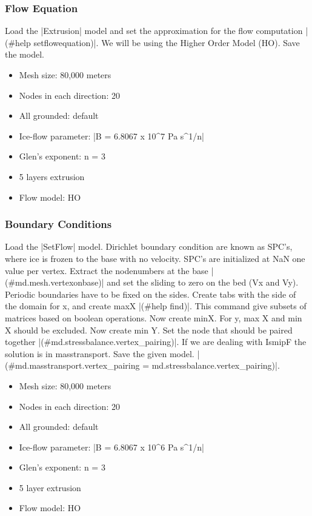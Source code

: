\subsubsection{Flow Equation} %
Load the \lstinlinebg|Extrusion| model and set the approximation for the flow computation \lstinlinebg|(#help setflowequation)|. We will be using the Higher Order Model (HO). Save the model.
\begin{itemize}
	\item Mesh size: 80,000 meters
	\item Nodes in each direction: 20
	\item All grounded: default
	\item Ice-flow parameter: \lstinlinebg|B = 6.8067 x 10^7 Pa s^1/n|
	\item Glen's exponent: n = 3
	\item 5 layers extrusion
	\item Flow model: HO
\end{itemize}

\subsubsection{Boundary Conditions} %
Load the \lstinlinebg|SetFlow| model. Dirichlet boundary condition are known as SPC's, where ice is frozen to the base with no velocity. SPC's are initialized at NaN one value per vertex. Extract the nodenumbers at the base \lstinlinebg|(#md.mesh.vertexonbase)| and set the sliding to zero on the bed (Vx and Vy). Periodic boundaries have to be fixed on the sides. Create tabs with the side of the domain for x, and create maxX \lstinlinebg|(#help find)|. This command give subsets of matrices based on boolean operations. Now create minX. For y, max X and min X should be excluded. Now create min Y. Set the node that should be paired together \lstinlinebg|(#md.stressbalance.vertex_pairing)|. If we are dealing with IsmipF the solution is in masstransport. Save the given model. \lstinlinebg|(#md.masstransport.vertex_pairing = md.stressbalance.vertex_pairing)|.
\begin{itemize}
	\item Mesh size: 80,000 meters
	\item Nodes in each direction: 20
	\item All grounded: default
	\item Ice-flow parameter: \lstinlinebg|B = 6.8067 x 10^6 Pa s^1/n|
	\item Glen's exponent: n = 3
	\item 5 layer extrusion
	\item Flow model: HO
\end{itemize}

